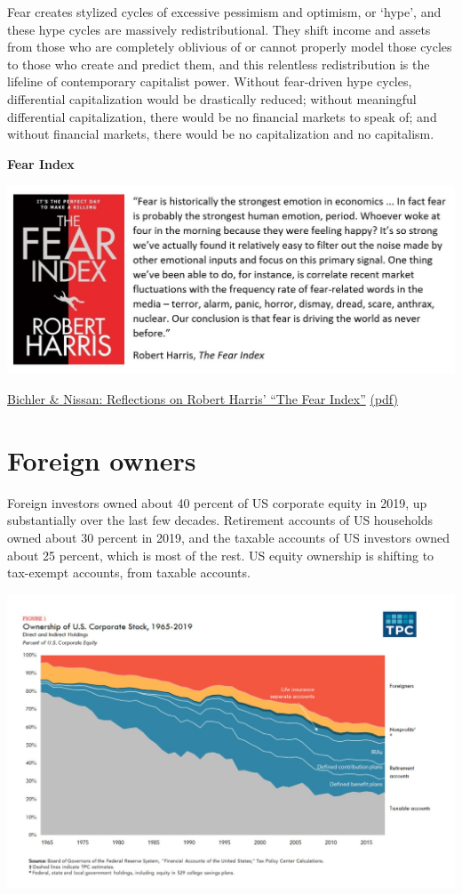 \documentclass[
]{book}
\begin{document}
Fear creates stylized cycles of excessive pessimism and optimism, or `hype', and these hype
cycles are massively redistributional. They shift income and assets from those who are
completely oblivious of or cannot properly model those cycles to those who create and predict
them, and this relentless redistribution is the lifeline of contemporary capitalist power. Without
fear-driven hype cycles, differential capitalization would be drastically reduced; without
meaningful differential capitalization, there would be no financial markets to speak of; and
without financial markets, there would be no capitalization and no capitalism.

\textbf{Fear Index}

\includegraphics{fig/fear_index.jpeg}

\href{http://bnarchives.yorku.ca/401/}{Bichler \& Nissan: Reflections on Robert Harris' ``The Fear Index''}
\href{pdf/Bichler_Nitzan_2014_Fear_Index.pdf}{(pdf)}

\hypertarget{foreign-owners}{%
\section{Foreign owners}\label{foreign-owners}}

Foreign investors owned about 40 percent of US corporate equity in 2019, up substantially over the last few decades. Retirement accounts of US households owned about 30 percent in 2019, and the taxable accounts of US investors owned about 25 percent, which is most of the rest.
US equity ownership is shifting to tax-exempt accounts, from taxable accounts.

\includegraphics{fig/Ownership_1965-2019_US_Corp_Stock.jpeg}
\end{document}
